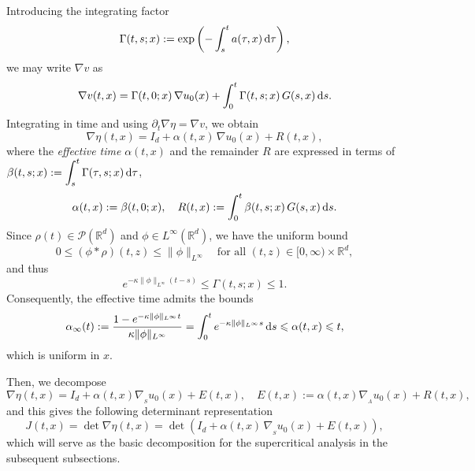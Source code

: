 \documentclass[11pt]{amsart}
\numberwithin{equation}{section}
\theoremstyle{definition}
\theoremstyle{remark}
\numberwithin{equation}{section}
\newcommand{\R}{\mathbb R}
\newcommand{\bq}{\begin{equation}}
\newcommand{\eq}{\end{equation}}
\newcommand{\lt}{\left}
\newcommand{\rt}{\right}
\newcommand{\pa}{\partial}
\newcommand{\calP}{\mathcal P}
\newcommand{\rd}{\textnormal{d}}
\newcommand{\ds}{\textnormal{d}s}
\newcommand{\nabS}{\nabla_{\!\!{}_S}}
\newcommand{\nabA}{\nabla_{\!\!{}_A}}
\renewcommand{\leq}{\leqslant}
\renewcommand{\le}{\leqslant}
\begin{document}
Introducing the integrating factor
\[
\Gamma(t,s;x):=\exp\lt(-\int_s^t a(\tau,x)\,\rd\tau\rt),
\]
we may write $\nabla v$ as 
\[
\nabla v(t,x) = \Gamma(t,0;x)\,\nabla u_0(x) + \int_0^t \Gamma(t,s;x)\,G(s,x)\,\ds.
\]
Integrating in time and using $\pa_t\nabla\eta=\nabla v$, we obtain
\[
\nabla\eta(t,x) = I_d + \alpha(t,x)\,\nabla u_0(x) + R(t,x),
\]
where the \emph{effective time} $\alpha(t,x)$ and the remainder $R$ are expressed 
in terms of $\displaystyle \beta(t,s;x) := \int_s^t \Gamma(\tau,s;x)\,\rd\tau$,
\[
\alpha(t,x):=\beta(t,0; x), \quad  R(t,x):=\int_0^t \beta(t,s;x)\,G(s,x)\,\ds.
\]
Since $\rho(t)\in\calP(\R^d)$ and $\phi\in L^\infty(\R^d)$, we have the uniform bound
\[
0 \leq (\phi * \rho)(t,z)\le \|\phi\|_{L^\infty}
\quad\text{for all }(t,z)\in[0,\infty)\times\R^d,
\]
and thus
\[
e^{-\kappa\|\phi\|_{L^\infty}(t-s)} \le \Gamma(t,s;x) \le 1.
\]
Consequently, the effective time admits the bounds
\[
\alpha_\infty(t) := \frac{1-e^{-\kappa\|\phi\|_{L^\infty}t}}{\kappa\|\phi\|_{L^\infty}} =\int_0^t e^{-\kappa\|\phi\|_{L^\infty}s}\,\ds \le \alpha(t,x)\le t,
\]
which is uniform in $x$.

Then, we decompose
\bq\label{eq:decom_gen}
\nabla\eta(t,x) = I_d+\alpha(t,x) \nabS u_0(x) + E(t,x), \quad  E(t,x):=
\alpha(t,x) \nabA u_0(x)+ R(t,x),
\eq
and this gives the following determinant representation
\[
J(t,x)=\det\nabla\eta(t,x)= \det\lt(I_d+\alpha(t,x)\,\nabS u_0(x)+  E(t,x)\rt),
\]
which will serve as the basic decomposition for the supercritical analysis in the subsequent subsections.
 
\end{document}
